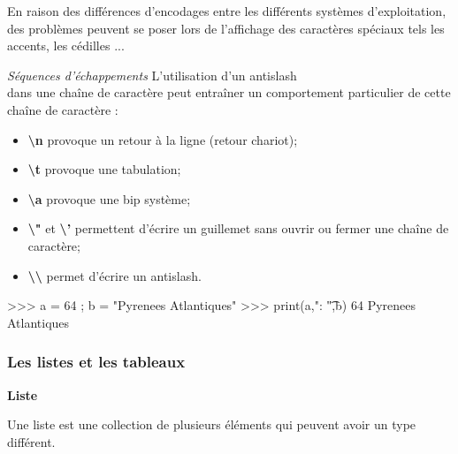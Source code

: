 \documentclass[10pt,fleqn]{article} %
\begin{document}
\begin{rem}
En raison des différences d'encodages entre les différents systèmes d'exploitation, des problèmes peuvent se poser lors de l'affichage des caractères spéciaux tels les accents, les cédilles ...
\end{rem}

\begin{rem}
\textit{Séquences d'échappements}
L'utilisation d'un antislash \\ dans une chaîne de caractère peut entraîner un comportement particulier de cette chaîne de caractère : 
\begin{itemize}
\item \textbf{\textbackslash n} provoque un retour à la ligne (retour chariot);
\item \textbf{\textbackslash t}  provoque une tabulation;
\item \textbf{\textbackslash a} provoque une bip système;
\item \textbf{\textbackslash "} et \textbf{\textbackslash '} permettent d'écrire un guillemet sans ouvrir ou fermer une chaîne de caractère;
\item \textbf{\textbackslash\textbackslash} permet d'écrire un antislash.
\end{itemize}
\end{rem}

\begin{exemple}
\begin{minipage}[c]{.45\linewidth}
\begin{py}
\begin{python}
>>> a = 64 ; b = "Pyrenees Atlantiques"
>>> print(a,": \t",b)
	64 	 Pyrenees Atlantiques
\end{python}
\end{py}
\end{minipage}\hfill
\begin{minipage}[c]{.45\linewidth}
\end{minipage}
\end{exemple}

\subsubsection{Les listes et les tableaux}

\begin{defi}
\textbf{Liste}

Une liste est une collection de plusieurs éléments qui peuvent avoir un type différent. 
\end{defi}
\end{document}
